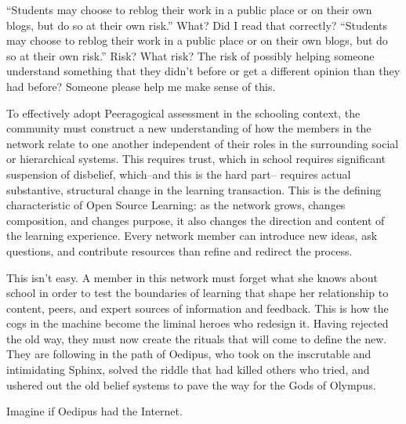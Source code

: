 ``Students may choose to reblog their work in a public place or on their
own blogs, but do so at their own risk.'' What? Did I read that
correctly? ``Students may choose to reblog their work in a public place
or on their own blogs, but do so at their own risk.'' Risk? What risk?
The risk of possibly helping someone understand something that they
didn't before or get a different opinion than they had before? Someone
please help me make sense of this.

To effectively adopt Peeragogical assessment in the schooling context,
the community must construct a new understanding of how the members in
the network relate to one another independent of their roles in the
surrounding social or hierarchical systems. This requires trust, which
in school requires significant suspension of disbelief, which--and this
is the hard part-- requires actual substantive, structural change in the
learning transaction. This is the defining characteristic of Open Source
Learning: as the network grows, changes composition, and changes
purpose, it also changes the direction and content of the learning
experience. Every network member can introduce new ideas, ask questions,
and contribute resources than refine and redirect the process.

This isn't easy. A member in this network must forget what she knows
about school in order to test the boundaries of learning that shape her
relationship to content, peers, and expert sources of information and
feedback. This is how the cogs in the machine become the liminal heroes
who redesign it. Having rejected the old way, they must now create the
rituals that will come to define the new. They are following in the path
of Oedipus, who took on the inscrutable and intimidating Sphinx, solved
the riddle that had killed others who tried, and ushered out the old
belief systems to pave the way for the Gods of Olympus.

Imagine if Oedipus had the Internet.

